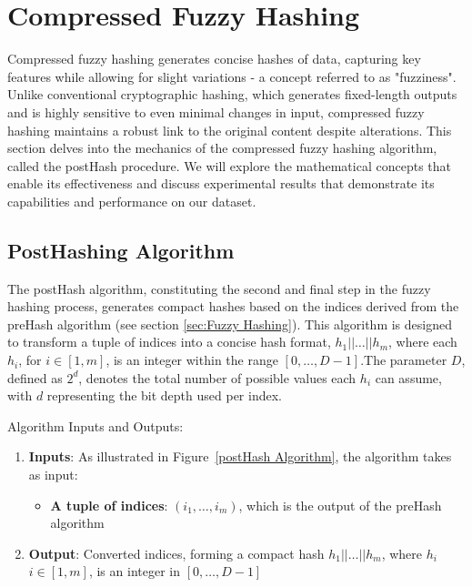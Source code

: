 \newpage


\section{Compressed Fuzzy Hashing}
\label{sec:Compressed Fuzzy Hashing}

Compressed fuzzy hashing generates concise hashes of data, capturing key features while allowing for slight variations - a concept referred to as "fuzziness". Unlike conventional cryptographic hashing, which generates fixed-length outputs and is highly sensitive to even minimal changes in input, compressed fuzzy hashing maintains a robust link to the original content despite alterations.
This section delves into the mechanics of the compressed fuzzy hashing algorithm, called the postHash procedure. We will explore the mathematical concepts that enable its effectiveness and discuss experimental results that demonstrate its capabilities and performance on our dataset.

\subsection{PostHashing Algorithm}

The postHash algorithm, constituting the second and final step in the fuzzy hashing process, generates compact hashes based on the indices derived from the preHash algorithm (see section \ref{sec:Fuzzy Hashing}). This algorithm is designed to transform a tuple of indices into a concise hash format, \(h_1 || \ldots || h_m\), where each \(h_i\), for \(i \in [1, m]\), is an integer within the range \([0, \ldots, D-1]\).The parameter \(D\), defined as \(2^d\), denotes the total number of possible values each \(h_i\) can assume, with \(d\) representing the bit depth used per index. 

Algorithm Inputs and Outputs:
\begin{enumerate}
    \item \textbf{Inputs}: As illustrated in Figure~\ref{postHash Algorithm}, the algorithm takes as input:
    \begin{itemize}
        \item \textbf{A tuple of indices}: \((i_1, \ldots, i_m)\), which is the output of the preHash algorithm
    \end{itemize}
    \item \textbf{Output}: Converted indices, forming a compact hash \(h_1|| \ldots || h_m\), where \(h_i\) \(i \in [1, m]\), is an integer in \([0, \ldots, D-1]\)
\end{enumerate}

